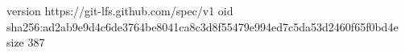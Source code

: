 version https://git-lfs.github.com/spec/v1
oid sha256:ad2ab9e9d4c6de3764be8041ca8c3d8f55479e994ed7c5da53d2460f65f0bd4e
size 387

